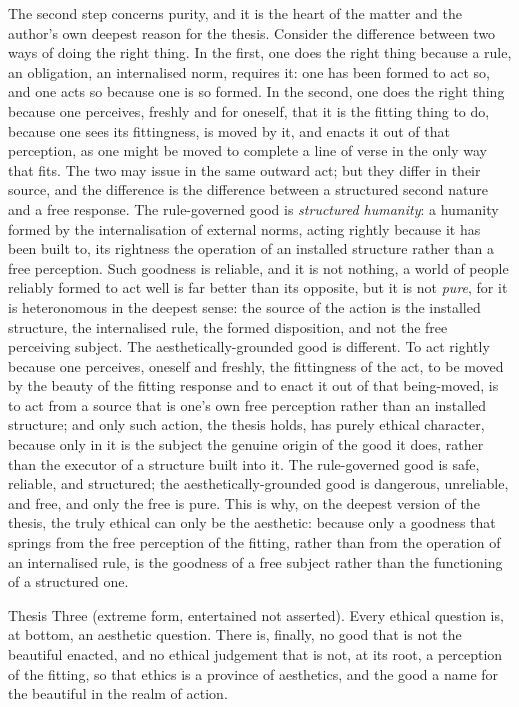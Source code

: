 The second step concerns purity, and it is the heart of the matter and the author's own deepest reason for the thesis. Consider the difference between two ways of doing the right thing. In the first, one does the right thing because a rule, an obligation, an internalised norm, requires it: one has been formed to act so, and one acts so because one is so formed. In the second, one does the right thing because one perceives, freshly and for oneself, that it is the fitting thing to do, because one sees its fittingness, is moved by it, and enacts it out of that perception, as one might be moved to complete a line of verse in the only way that fits. The two may issue in the same outward act; but they differ in their source, and the difference is the difference between a structured second nature and a free response. The rule-governed good is \emph{structured humanity}: a humanity formed by the internalisation of external norms, acting rightly because it has been built to, its rightness the operation of an installed structure rather than a free perception. Such goodness is reliable, and it is not nothing, a world of people reliably formed to act well is far better than its opposite, but it is not \emph{pure}, for it is heteronomous in the deepest sense: the source of the action is the installed structure, the internalised rule, the formed disposition, and not the free perceiving subject. The aesthetically-grounded good is different. To act rightly because one perceives, oneself and freshly, the fittingness of the act, to be moved by the beauty of the fitting response and to enact it out of that being-moved, is to act from a source that is one's own free perception rather than an installed structure; and only such action, the thesis holds, has purely ethical character, because only in it is the subject the genuine origin of the good it does, rather than the executor of a structure built into it. The rule-governed good is safe, reliable, and structured; the aesthetically-grounded good is dangerous, unreliable, and free, and only the free is pure. This is why, on the deepest version of the thesis, the truly ethical can only be the aesthetic: because only a goodness that springs from the free perception of the fitting, rather than from the operation of an internalised rule, is the goodness of a free subject rather than the functioning of a structured one.

\begin{thesis}{Thesis Three (extreme form, entertained not asserted).}
Every ethical question is, at bottom, an aesthetic question. There is, finally, no good that is not the beautiful enacted, and no ethical judgement that is not, at its root, a perception of the fitting, so that ethics is a province of aesthetics, and the good a name for the beautiful in the realm of action.
\end{thesis}


